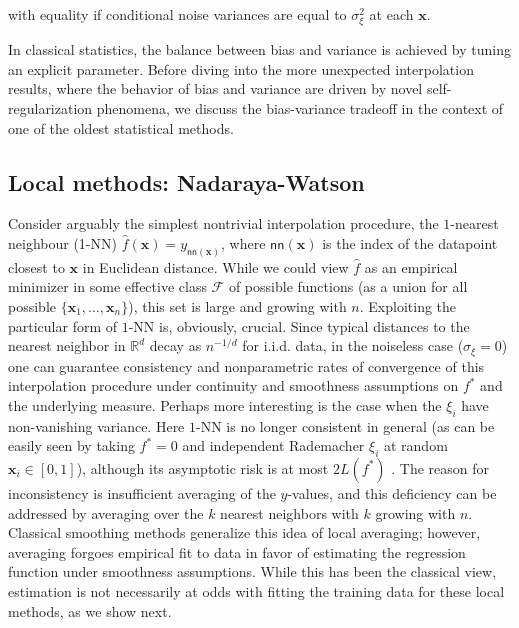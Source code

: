 with equality if conditional noise variances are equal to $\sigma_\xi^2$ at each ${\boldsymbol x}$.

In classical statistics, the balance between bias and variance is achieved by tuning an explicit parameter. Before diving into the more unexpected interpolation results, where the behavior of bias and variance are driven by novel self-regularization phenomena, we discuss the bias-variance tradeoff in the context of one of the oldest statistical methods.  

\subsection{Local methods: Nadaraya-Watson}
\label{sec:local_methods}

Consider arguably the simplest nontrivial interpolation procedure, the $1$-nearest neighbour (1-NN) $\widehat{f}({\boldsymbol x})=y_{\mathsf{nn}({\boldsymbol x})}$, where
$\mathsf{nn}({\boldsymbol x})$ is the index of the datapoint closest to ${\boldsymbol x}$ in Euclidean distance. While we could view $\widehat{f}$ as an empirical minimizer in some effective class ${\mathcal F}$ of possible functions (as a union for all possible $\{{\boldsymbol x}_1,\ldots,{\boldsymbol x}_n\}$), this set is large and growing with $n$. Exploiting the particular form of $1$-NN is, obviously, crucial. Since typical distances to the nearest neighbor in ${\mathbb R}^d$ decay as $n^{-1/d}$ for i.i.d. data, in the noiseless case ($\sigma_\xi=0$) one can guarantee consistency and nonparametric rates of convergence of this interpolation procedure under continuity and smoothness assumptions on $f^*$ and the underlying measure. Perhaps more interesting is the case when the $\xi_i$ have non-vanishing variance. Here $1$-NN is no longer consistent in general (as can be easily seen by taking $f^*=0$ and independent Rademacher $\xi_i$ at random
${\boldsymbol x}_i\in[0,1]$), although its asymptotic risk is at most $2L(f^*)$ \cite{cover1967nearest}. The reason for inconsistency is insufficient averaging of the $y$-values, and this deficiency can be addressed by averaging over the $k$ nearest neighbors with $k$ growing with $n$. Classical smoothing methods generalize this idea of local averaging; however, averaging forgoes empirical fit to data in favor of estimating the regression function under smoothness assumptions. While this has been the classical view, estimation is not necessarily at odds with fitting the training data for these local methods, as we show next.

